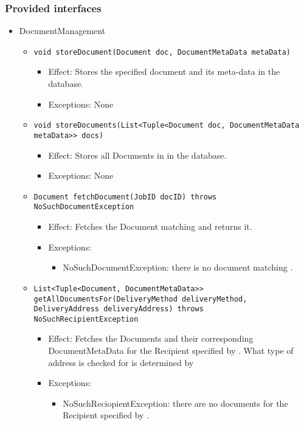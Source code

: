 \subsubsection*{Provided interfaces}
\begin{itemize}
    \item DocumentManagement
	\begin{itemize}
		\item \texttt{void storeDocument(Document doc, DocumentMetaData metaData)}
		\begin{itemize}
			\item Effect: Stores the specified document and its meta-data in the database.
			\item Exceptions: None
		\end{itemize}

		\item \texttt{void storeDocuments(List<Tuple<Document doc, DocumentMetaData metaData>> docs)}
		\begin{itemize}
			\item Effect: Stores all Documents in  in the database.
			\item Exceptions: None
		\end{itemize}
		
		\item \texttt{Document fetchDocument(JobID docID) throws NoSuchDocumentException}
		\begin{itemize}
			\item Effect: Fetches the Document matching  and returns it.
			\item Exceptions: 
			\begin{itemize}
				\item NoSuchDocumentException: there is no document matching .
			\end{itemize}
		\end{itemize}

		\item \texttt{List<Tuple<Document, DocumentMetaData>> getAllDocumentsFor(DeliveryMethod deliveryMethod, DeliveryAddress deliveryAddress) throws NoSuchRecipientException}
		\begin{itemize}
			\item Effect: Fetches the Documents and their corresponding DocumentMetaData for the Recipient specified by . What type of address is checked for is determined by 
			\item Exceptions: 
			\begin{itemize}
				\item NoSuchReciopientException: there are no documents for the Recipient specified by .
			\end{itemize}
		\end{itemize}
	\end{itemize}


\end{itemize}

